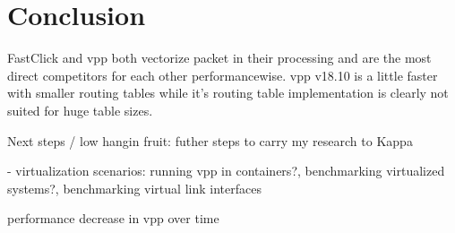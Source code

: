 \chapter{Conclusion}

FastClick and \Ac{vpp} both vectorize packet in their processing and
are the most direct competitors for each other performancewise.
\Ac{vpp} v18.10 is a little faster with smaller routing tables while
it's routing table implementation is clearly not suited for huge
table sizes. 

Next steps / low hangin fruit: futher steps to carry my research to Kappa

- virtualization scenarios: running vpp in containers?, benchmarking virtualized systems?, benchmarking virtual link interfaces


performance decrease in vpp over time

